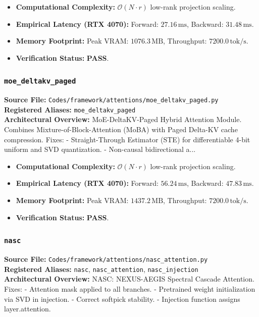 \begin{itemize}
    \item \textbf{Computational Complexity:} $\mathcal{O}(N \cdot r)$ low-rank projection scaling.
    \item \textbf{Empirical Latency (RTX 4070):} Forward: $27.16\,\text{ms}$, Backward: $31.48\,\text{ms}$.
    \item \textbf{Memory Footprint:} Peak VRAM: $1076.3\,\text{MB}$, Throughput: $7200.0\,\text{tok/s}$.
    \item \textbf{Verification Status:} \textbf{PASS}.
\end{itemize}

\subsubsection{\texttt{moe\_deltakv\_paged}}
\textbf{Source File:} \texttt{Codes/framework/attentions/moe\_deltakv\_paged.py} \\
\textbf{Registered Aliases:} \texttt{moe\_deltakv\_paged} \\
\textbf{Architectural Overview:} MoE-DeltaKV-Paged Hybrid Attention Module. Combines Mixture-of-Block-Attention (MoBA) with Paged Delta-KV cache compression. Fixes: - Straight-Through Estimator (STE) for differentiable 4-bit uniform and SVD quantization. - Non-causal bidirectional a...

\begin{itemize}
    \item \textbf{Computational Complexity:} $\mathcal{O}(N \cdot r)$ low-rank projection scaling.
    \item \textbf{Empirical Latency (RTX 4070):} Forward: $56.24\,\text{ms}$, Backward: $47.83\,\text{ms}$.
    \item \textbf{Memory Footprint:} Peak VRAM: $1437.2\,\text{MB}$, Throughput: $7200.0\,\text{tok/s}$.
    \item \textbf{Verification Status:} \textbf{PASS}.
\end{itemize}

\subsubsection{\texttt{nasc}}
\textbf{Source File:} \texttt{Codes/framework/attentions/nasc\_attention.py} \\
\textbf{Registered Aliases:} \texttt{nasc}, \texttt{nasc\_attention}, \texttt{nasc\_injection} \\
\textbf{Architectural Overview:} NASC: NEXUS-AEGIS Spectral Cascade Attention. Fixes: - Attention mask applied to all branches. - Pretrained weight initialization via SVD in injection. - Correct softpick stability. - Injection function assigns layer.attention.

